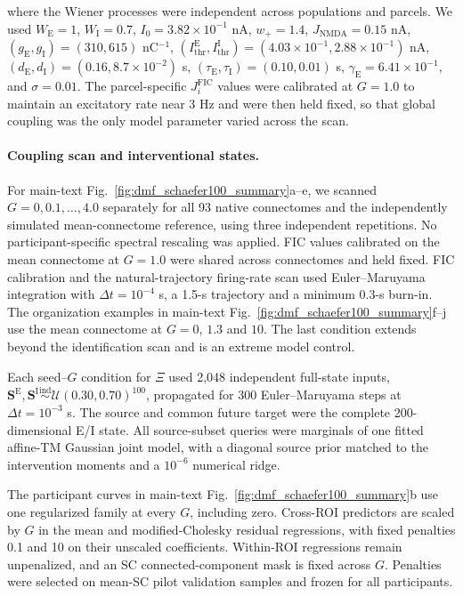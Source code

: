 \documentclass[fleqn,10pt]{wlscirep}
\begin{document}
where the Wiener processes were independent across populations and parcels. We used $W_{\mathrm E}=1$, $W_{\mathrm I}=0.7$, $I_0=3.82\times10^{-1}$ nA, $w_{+}=1.4$, $J_{\mathrm{NMDA}}=0.15$ nA, $(g_{\mathrm E},g_{\mathrm I})=(310,615)$ nC$^{-1}$, $(I_{\mathrm{thr}}^{\mathrm E},I_{\mathrm{thr}}^{\mathrm I})=(4.03\times10^{-1},2.88\times10^{-1})$ nA, $(d_{\mathrm E},d_{\mathrm I})=(0.16,8.7\times10^{-2})$ s, $(\tau_{\mathrm E},\tau_{\mathrm I})=(0.10,0.01)$ s, $\gamma_{\mathrm E}=6.41\times10^{-1}$, and $\sigma=0.01$. The parcel-specific $J_i^{\mathrm{FIC}}$ values were calibrated at $G=1.0$ to maintain an excitatory rate near 3 Hz and were then held fixed, so that global coupling was the only model parameter varied across the scan.

\paragraph{Coupling scan and interventional states.}
For main-text Fig.~\ref{fig:dmf_schaefer100_summary}a--e, we scanned $G=0,0.1,\ldots,4.0$ separately for all 93 native connectomes and the independently simulated mean-connectome reference, using three independent repetitions. No participant-specific spectral rescaling was applied. FIC values calibrated on the mean connectome at $G=1.0$ were shared across connectomes and held fixed. FIC calibration and the natural-trajectory firing-rate scan used Euler--Maruyama integration with $\Delta t=10^{-4}$ s, a 1.5-s trajectory and a minimum 0.3-s burn-in. The organization examples in main-text Fig.~\ref{fig:dmf_schaefer100_summary}f--j use the mean connectome at $G=0$, $1.3$ and $10$. The last condition extends beyond the identification scan and is an extreme model control.

Each seed--$G$ condition for $\Xi$ used 2,048 independent full-state inputs, $\boldsymbol{S}^{\mathrm E},\boldsymbol{S}^{\mathrm I}\overset{\mathrm{ind}}{\sim}\mathcal{U}(0.30,0.70)^{100}$, propagated for 300 Euler--Maruyama steps at $\Delta t=10^{-3}$ s. The source and common future target were the complete 200-dimensional E/I state. All source-subset queries were marginals of one fitted affine-TM Gaussian joint model, with a diagonal source prior matched to the intervention moments and a $10^{-6}$ numerical ridge.

The participant curves in main-text Fig.~\ref{fig:dmf_schaefer100_summary}b use one regularized family at every $G$, including zero. Cross-ROI predictors are scaled by $G$ in the mean and modified-Cholesky residual regressions, with fixed penalties 0.1 and 10 on their unscaled coefficients. Within-ROI regressions remain unpenalized, and an SC connected-component mask is fixed across $G$. Penalties were selected on mean-SC pilot validation samples and frozen for all participants.
\end{document}
